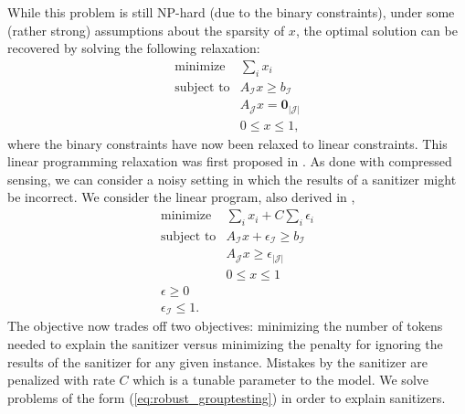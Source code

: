 While this problem is still NP-hard (due to the binary constraints), under some (rather strong) assumptions about the sparsity of $x$, the optimal solution can be recovered by solving the following relaxation:
\[\begin{array}{ll}
\mbox{minimize} & \sum_i{x_i}\\
\mbox{subject to} & A_\mathcal{I}x\geq b_\mathcal{I} \\
& A_\mathcal{J}x=\textbf{0}_{|\mathcal{J}|} \\
& 0\leq x \leq 1,
\end{array}\]
where the binary constraints have now been relaxed to linear constraints. This linear programming relaxation was first proposed in \cite{MalioutovM2012}. As done with compressed sensing, we can consider a noisy setting in which the results of a sanitizer might be incorrect. We consider the linear program, also derived in \cite{MalioutovM2012},
\begin{equation}
\label{eq:robust_grouptesting}
\begin{array}{ll}
\mbox{minimize} & \sum_i{x_i}+C\sum_i{\epsilon_i}\\
\mbox{subject to} & A_\mathcal{I}x+\epsilon_\mathcal{I}\geq b_\mathcal{I} \\
& A_\mathcal{J}x\geq \epsilon_{|\mathcal{J}|} \\
& 0\leq x \leq 1\\
\epsilon\geq0\\
\epsilon_\mathcal{I}\leq 1.
\end{array}\end{equation}
The objective now trades off two objectives: minimizing the number of tokens needed to explain the sanitizer versus minimizing the penalty for ignoring the results of the sanitizer for any given instance. Mistakes by the sanitizer are penalized with rate $C$ which is a tunable parameter to the model. We solve problems of the form (\ref{eq:robust_grouptesting}) in order to explain sanitizers.

